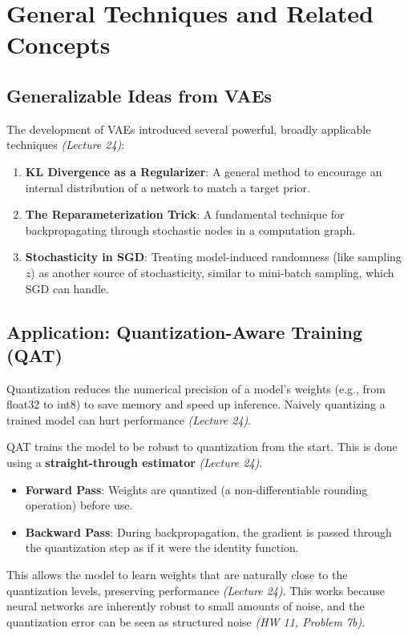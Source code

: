 \documentclass[11pt]{article}
\begin{document}
\section{General Techniques and Related Concepts}

\subsection{Generalizable Ideas from VAEs}
The development of VAEs introduced several powerful, broadly applicable techniques \textit{(Lecture 24)}:
\begin{enumerate}
    \item \textbf{KL Divergence as a Regularizer}: A general method to encourage an internal distribution of a network to match a target prior.
    \item \textbf{The Reparameterization Trick}: A fundamental technique for backpropagating through stochastic nodes in a computation graph.
    \item \textbf{Stochasticity in SGD}: Treating model-induced randomness (like sampling $z$) as another source of stochasticity, similar to mini-batch sampling, which SGD can handle.
\end{enumerate}

\subsection{Application: Quantization-Aware Training (QAT)}
Quantization reduces the numerical precision of a model's weights (e.g., from float32 to int8) to save memory and speed up inference. Naively quantizing a trained model can hurt performance \textit{(Lecture 24)}.

QAT trains the model to be robust to quantization from the start. This is done using a \textbf{straight-through estimator} \textit{(Lecture 24)}.
\begin{itemize}
    \item \textbf{Forward Pass}: Weights are quantized (a non-differentiable rounding operation) before use.
    \item \textbf{Backward Pass}: During backpropagation, the gradient is passed through the quantization step as if it were the identity function.
\end{itemize}
This allows the model to learn weights that are naturally close to the quantization levels, preserving performance \textit{(Lecture 24)}. This works because neural networks are inherently robust to small amounts of noise, and the quantization error can be seen as structured noise \textit{(HW 11, Problem 7b)}.
\end{document}
